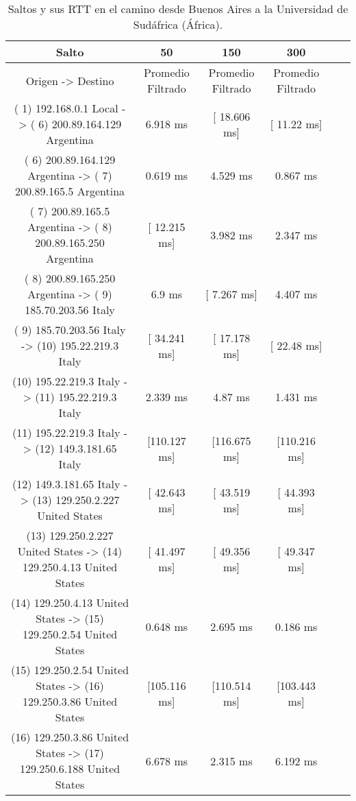 \begin{table}[]
\centering
\caption{Saltos y sus RTT en el camino desde Buenos Aires a la Universidad de Sudáfrica (África).}
\begin{tabular}{ | c | c | c | c | c | c | }
	\hline 
Salto	& 50	& 150	& 300 \\ \hline
Origen                ->               Destino               	               & Promedio Filtrado &  Promedio Filtrado&	Promedio Filtrado \\ \hline
( 1) 192.168.0.1     Local           -> ( 6) 200.89.164.129  Argentina    &  	     6.918 ms   &	  [ 18.606 ms]  	 & [  11.22 ms]   \\ \hline
( 6) 200.89.164.129  Argentina       -> ( 7) 200.89.165.5    Argentina    &  	     0.619 ms   &	     4.529 ms   	 &    0.867 ms    \\ \hline
( 7) 200.89.165.5    Argentina       -> ( 8) 200.89.165.250  Argentina    &  	  [ 12.215 ms]  &	     3.982 ms   	 &    2.347 ms    \\ \hline
( 8) 200.89.165.250  Argentina       -> ( 9) 185.70.203.56   Italy        &  	       6.9 ms   &	  [  7.267 ms]  	 &    4.407 ms    \\ \hline
( 9) 185.70.203.56   Italy           -> (10) 195.22.219.3    Italy        &  	  [ 34.241 ms]  &	  [ 17.178 ms]  	 & [  22.48 ms]   \\ \hline
(10) 195.22.219.3    Italy           -> (11) 195.22.219.3    Italy        &  	     2.339 ms   &	      4.87 ms   	 &    1.431 ms    \\ \hline
(11) 195.22.219.3    Italy           -> (12) 149.3.181.65    Italy        &  	  [110.127 ms]  &	  [116.675 ms]  	 & [110.216 ms]   \\ \hline
(12) 149.3.181.65    Italy           -> (13) 129.250.2.227   United States&  	  [ 42.643 ms]  &	  [ 43.519 ms]  	 & [ 44.393 ms]   \\ \hline
(13) 129.250.2.227   United States   -> (14) 129.250.4.13    United States&  	  [ 41.497 ms]  &	  [ 49.356 ms]  	 & [ 49.347 ms]   \\ \hline
(14) 129.250.4.13    United States   -> (15) 129.250.2.54    United States&  	     0.648 ms   &	     2.695 ms   	 &    0.186 ms    \\ \hline
(15) 129.250.2.54    United States   -> (16) 129.250.3.86    United States&  	  [105.116 ms]  &	  [110.514 ms]  	 & [103.443 ms]   \\ \hline
(16) 129.250.3.86    United States   -> (17) 129.250.6.188   United States&  	     6.678 ms   &	     2.315 ms   	 &    6.192 ms    \\ \hline

\end{tabular}
\end{table}

